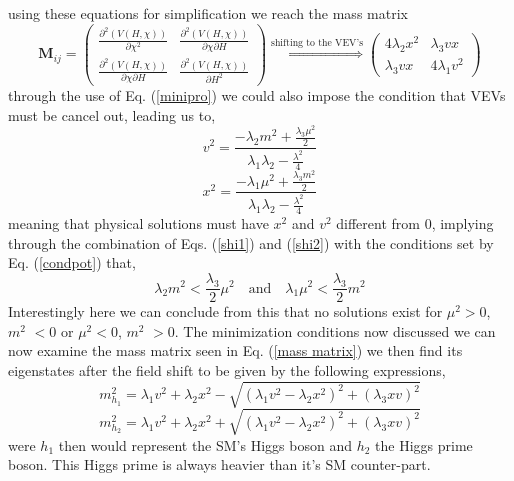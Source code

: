 \documentclass[12pt]{article}
\begin{document}
%
using these equations for simplification we reach the mass matrix
\begin{equation}
\mathbf{M}_{ij} = \begin{pmatrix}
\frac{\partial^2 (V(H,\chi))}{\partial \chi^2} & \frac{\partial^2 (V(H,\chi))}{\partial \chi \partial H} \\  \frac{\partial^2 (V(H,\chi))}{\partial \chi \partial H}  & \frac{\partial^2 (V(H,\chi))}{\partial H^2}
\end{pmatrix} \overset{\text{shifting to the VEV's}}{\Rightarrow} \begin{pmatrix}
4 \lambda_2 x^2 & \lambda_3 v x \\ 
\lambda_3 v x   & 4 \lambda_1 v^2 
\end{pmatrix}
\label{mass matrix}
\end{equation}
through the use of Eq. (\ref{minipro}) we could also impose the condition that VEVs must be cancel out, leading us to,  
\begin{equation}
v^2 =  \frac{- \lambda_2 m^2 + \frac{\lambda_3 \mu^2}{2}}{\lambda_1 \lambda_2 -\frac{\lambda^2}{4}}
\label{shi2}
\end{equation} 
%
\begin{equation}
x^2 =  \frac{- \lambda_1 \mu^2 + \frac{\lambda_3 m^2}{2}}{\lambda_1 \lambda_2 -\frac{\lambda^2}{4}}
\label{shi1}
\end{equation} 
%
meaning that physical solutions must have $x^2$ and $v^2$ different from 0, implying through the combination of Eqs. (\ref{shi1}) and (\ref{shi2}) with the conditions set by Eq. (\ref{condpot}) that, 
%
\begin{equation}
\lambda_2 m^2 < \frac{\lambda_3}{2} \mu^2   \quad \text{and} \quad \lambda_1 \mu^2 < \frac{\lambda_3}{2} m^2 
\end{equation}
%
Interestingly here we can conclude from this that no solutions exist for $\mu^2 >0 $, $m^2$ $ < 0 $ or $\mu^2 <0 $, $m^2$ $ > 0 $.    
%
The minimization conditions now discussed we can now examine the mass matrix seen in Eq. (\ref{mass matrix})
we then find its eigenstates after the field shift to be given by the following expressions,
%
\begin{equation}
m_{h_1}^2 = \lambda_1 v^2 + \lambda_2 x^2 - \sqrt{(\lambda_1 v^2 - \lambda_2 x^2)^2 + (\lambda_3 x v)^2}
\label{massa1}
\end{equation}
%
\begin{equation}
m_{h_2}^2 = \lambda_1 v^2 + \lambda_2 x^2 + \sqrt{(\lambda_1 v^2 - \lambda_2 x^2)^2 + (\lambda_3 x v)^2}
\label{massa2}
\end{equation}
%
were $h_1$ then would represent the SM's Higgs boson and $h_2$ the Higgs prime boson. This Higgs prime is always heavier than it's SM counter-part.
%
\end{document}
